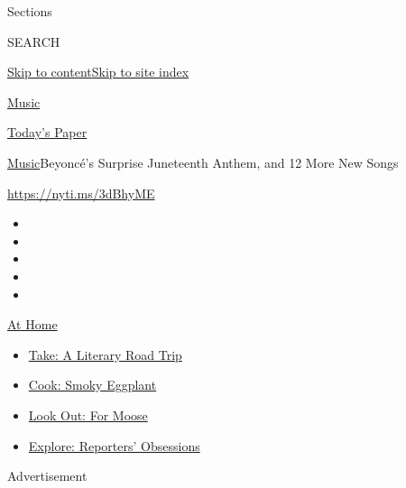 Sections

SEARCH

\protect\hyperlink{site-content}{Skip to
content}\protect\hyperlink{site-index}{Skip to site index}

\href{https://www.nytimes.com/section/arts/music}{Music}

\href{https://myaccount.nytimes.com/auth/login?response_type=cookie\&client_id=vi}{}

\href{https://www.nytimes.com/section/todayspaper}{Today's Paper}

\href{/section/arts/music}{Music}\textbar{}Beyoncé's Surprise Juneteenth
Anthem, and 12 More New Songs

\url{https://nyti.ms/3dBhyME}

\begin{itemize}
\item
\item
\item
\item
\item
\end{itemize}

\href{https://www.nytimes.com/spotlight/at-home?action=click\&pgtype=Article\&state=default\&region=TOP_BANNER\&context=at_home_menu}{At
Home}

\begin{itemize}
\tightlist
\item
  \href{https://www.nytimes.com/2020/07/28/books/time-for-a-literary-road-trip.html?action=click\&pgtype=Article\&state=default\&region=TOP_BANNER\&context=at_home_menu}{Take:
  A Literary Road Trip}
\item
  \href{https://www.nytimes.com/2020/07/29/magazine/bored-with-your-home-cooking-some-smoky-eggplant-will-fix-that.html?action=click\&pgtype=Article\&state=default\&region=TOP_BANNER\&context=at_home_menu}{Cook:
  Smoky Eggplant}
\item
  \href{https://www.nytimes.com/2020/07/27/travel/moose-michigan-isle-royale.html?action=click\&pgtype=Article\&state=default\&region=TOP_BANNER\&context=at_home_menu}{Look
  Out: For Moose}
\item
  \href{https://www.nytimes.com/interactive/2020/at-home/even-more-reporters-editors-diaries-lists-recommendations.html?action=click\&pgtype=Article\&state=default\&region=TOP_BANNER\&context=at_home_menu}{Explore:
  Reporters' Obsessions}
\end{itemize}

Advertisement

